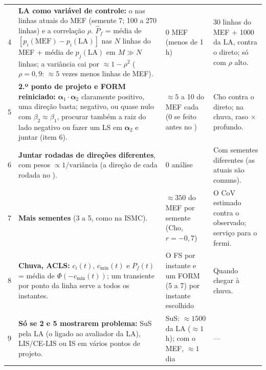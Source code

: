 \documentclass[11pt,a4paper]{article}
\begin{document}
{\begin{longtable}{L{0.25cm}L{8.2cm}L{3.4cm}L{3.5cm}}
4 & \textbf{LA como variável de controle:} o  nas linhas atuais do MEF (semente 7; 100 a 270 linhas) e
  a correlação $\rho$. $\hat P_f$ = média de $[p_i(\text{MEF}) - p_i(\text{LA})]$ nas $N$ linhas do MEF + média de
  $p_j(\text{LA})$ em $M \gg N$ linhas; a variância cai por $\approx 1 - \rho^2$ ($\rho = 0{,}9$: $\approx 5$ vezes menos
  linhas de MEF). &
  0 MEF (menos de 1 h) & 30 linhas do MEF + 1000 da LA, contra o direto; só com $\rho$ alto. \\
5 & \textbf{2.º ponto de projeto e FORM reiniciado:} $\bm\alpha_1\cdot\bm\alpha_2$ claramente positivo, uma direção
  basta; negativo, ou quase nulo com $\beta_2 \approx \beta_1$, procurar também a raiz do lado negativo ou fazer um LS
  em $\bm\alpha_2$ e juntar (item 6). &
  $\approx 5$ a 10 do MEF cada (0 se feito antes no ) & Cho contra o direto; na chuva, raso $\times$
  profundo. \\
6 & \textbf{Juntar rodadas de direções diferentes}, com pesos $\propto 1/\text{variância}$ (a direção de cada rodada no
  ). & 0 análise & Com sementes diferentes (as atuais são comuns). \\
7 & \textbf{Mais sementes} (3 a 5, como na ISMC). & $\approx 350$ do MEF por semente (Cho, $r = -0{,}7$) & O CoV
  estimado contra o observado; serviço para o fermi. \\
8 & \textbf{Chuva, ACLS:} $c_i(t)$, $c_\text{min}(t)$ e $P_f(t)$ = média de $\Phi(-c_\text{min}(t))$; um transiente por
  ponto da linha serve a todos os instantes. &
  O FS por instante e um FORM (5 a 7) por instante escolhido & Quando chegar à chuva. \\
9 & \textbf{Só se 2 e 5 mostrarem problema:} SuS pela LA (o  ligado ao avaliador da LA), LIS/CE-LIS ou IS
  em vários pontos de projeto. & SuS: $\approx 1500$ da LA ($\approx 1$ h); com o MEF, $\approx 1$ dia & --- \\
\end{longtable}}
\end{document}
